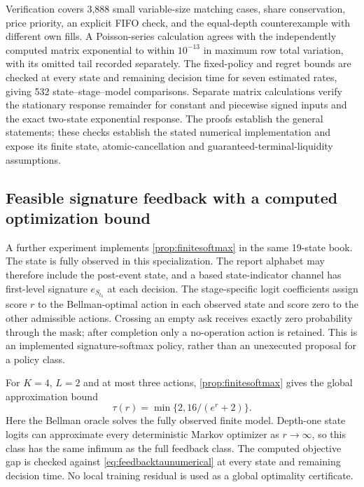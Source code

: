 \documentclass[11pt]{article}
\numberwithin{equation}{section}
\theoremstyle{definition}
\theoremstyle{remark}
\theoremstyle{definition}
\begin{document}
Verification covers 3,888 small variable-size matching cases, share
conservation, price priority, an explicit FIFO check, and the equal-depth
counterexample with different own fills. A Poisson-series calculation agrees
with the independently computed matrix exponential to within $10^{-13}$
in maximum row total variation, with its omitted tail recorded separately.
The fixed-policy and regret bounds are checked at every state and remaining
decision time for seven estimated rates, giving 532 state--stage--model
comparisons. Separate matrix calculations verify the stationary response
remainder for constant and piecewise signed inputs and the exact two-state
exponential response. The proofs establish the general statements; these
checks establish the stated numerical implementation and expose its finite
state, atomic-cancellation and guaranteed-terminal-liquidity assumptions.

\subsection{Feasible signature feedback with a computed optimization bound}
\label{sec:feedbackexperiment}

A further experiment implements \cref{prop:finitesoftmax} in the same
19-state book. The state is fully observed in this specialization. The
report alphabet may therefore include the post-event state, and a based
state-indicator channel has first-level signature $e_{S_{t_k}}$ at each
decision. The stage-specific logit coefficients assign score $r$ to the
Bellman-optimal action in each observed state and score zero to the other
admissible actions. Crossing an empty ask receives exactly zero probability
through the mask; after completion only a no-operation action is retained.
This is an implemented signature-softmax policy, rather than an unexecuted
proposal for a policy class.

For $K=4$, $L=2$ and at most three actions,
\cref{prop:finitesoftmax} gives the global approximation bound
\begin{equation}\label{eq:feedbacktaunumerical}
 \tau(r)=\min\{2,16/(e^r+2)\}.
\end{equation}
Here the Bellman oracle solves the fully observed finite model. Depth-one
state logits can approximate every deterministic Markov optimizer as
$r\to\infty$, so this class has the same infimum as the full feedback
class. The computed objective gap is checked against \eqref{eq:feedbacktaunumerical}
at every state and remaining decision time. No local training residual is
used as a global optimality certificate.
\end{document}

